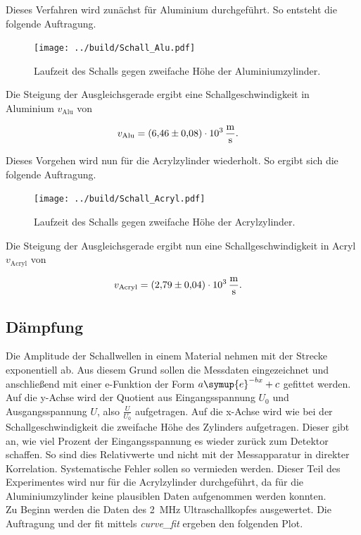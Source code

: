 \noindent Dieses Verfahren wird zunächst für Aluminium durchgeführt. So entsteht die folgende Auftragung.

\begin{figure}[H]
    \centering
    \texttt{[image: ../build/Schall\_Alu.pdf]}
    \caption{Laufzeit des Schalls gegen zweifache Höhe der Aluminiumzylinder.}
\end{figure}

\noindent Die Steigung der Ausgleichsgerade ergibt eine Schallgeschwindigkeit in Aluminium $v_\text{Alu}$ von 

\begin{align*}
    v_\text{Alu} &= \qty{6.46\pm0.08e3}{\meter \per \second}.
\end{align*}

\noindent Dieses Vorgehen wird nun für die Acrylzylinder wiederholt. So ergibt sich die folgende Auftragung.

\begin{figure}[H]
    \centering
    \texttt{[image: ../build/Schall\_Acryl.pdf]}
    \caption{Laufzeit des Schalls gegen zweifache Höhe der Acrylzylinder.}
\end{figure}

\noindent Die Steigung der Ausgleichsgerade ergibt nun eine Schallgeschwindigkeit in Acryl $v_\text{Acryl}$ von 

\begin{align*}
    v_\text{Acryl} &= \qty{2.79\pm0.04e3}{\meter \per \second}.
\end{align*}


\subsection{Dämpfung}
Die Amplitude der Schallwellen in einem Material nehmen mit der Strecke exponentiell ab. Aus diesem Grund 
sollen die Messdaten eingezeichnet und anschließend mit einer e-Funktion der Form $a \symup{e} ^{-bx} +c$ 
gefittet werden. Auf die y-Achse wird der Quotient aus Eingangsspannung $U_0$ und Ausgangsspannung $U$, 
also $\frac{U}{U_0}$ aufgetragen. Auf die x-Achse wird wie bei der Schallgeschwindigkeit die zweifache Höhe 
des Zylinders aufgetragen. 
Dieser gibt an, wie viel Prozent der Eingangsspannung es wieder zurück zum Detektor schaffen. So sind dies 
Relativwerte und nicht mit der Messapparatur in direkter Korrelation. Systematische Fehler sollen so vermieden 
werden. Dieser Teil des Experimentes wird nur für die Acrylzylinder durchgeführt, da für die Aluminiumzylinder 
keine plausiblen Daten aufgenommen werden konnten. \\
\noindent Zu Beginn werden die Daten des \qty{2}{\mega \hertz} Ultraschallkopfes ausgewertet. Die Auftragung 
und der fit mittels \emph{curve\_fit} ergeben den folgenden Plot.

